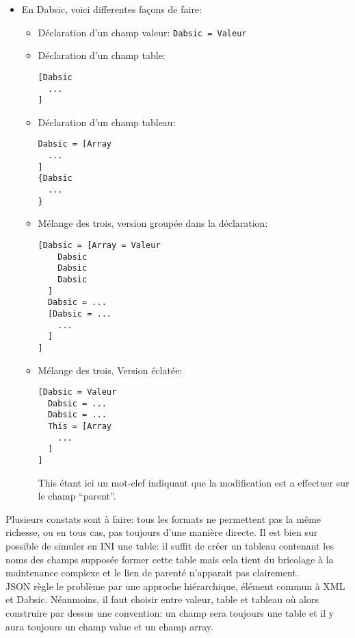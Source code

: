 \documentclass[a5paper, 12pt]{book}
\begin{document}
\begin{itemize}
  \item En Dabsic, voici differentes façons de faire:
    \begin{itemize}
      \item Déclaration d'un champ valeur:
        \verb!Dabsic = Valeur!
      \item Déclaration d'un champ table:
      \begin{verbatim}
[Dabsic
  ...
]
        \end{verbatim}
      \item Déclaration d'un champ tableau:
        \begin{verbatim}
Dabsic = [Array
  ...
]
{Dabsic
  ...
}
        \end{verbatim}
      \item Mélange des trois, version groupée dans la déclaration:
        \begin{verbatim}
[Dabsic = [Array = Valeur
    Dabsic
    Dabsic
    Dabsic
  ]
  Dabsic = ...
  [Dabsic = ...
    ...
  ]
]
\end{verbatim}

	\newpage
      \item Mélange des trois, Version éclatée:
        \begin{verbatim}
[Dabsic = Valeur
  Dabsic = ...
  Dabsic = ...
  This = [Array
    ...
  ]
]
\end{verbatim}
		\vspace{\baselineskip}
        This étant ici un mot-clef indiquant que la modification est a
        effectuer sur le champ ``parent''.
    \end{itemize}
\end{itemize}
\vspace{\baselineskip}

Plusieurs constats sont à faire: tous les formats ne permettent pas
la même richesse, ou en tous cas, pas toujours d'une manière directe.
Il est bien sur possible de simuler en INI une table: il suffit de créer
un tableau contenant les noms des champs supposée former cette table
mais cela tient du bricolage à la maintenance complexe et le lien
de parenté n'apparait pas clairement.\\

JSON règle le problème par une approche hiérarchique, élément commun
à XML et Dabsic. Néanmoins, il faut choisir entre valeur, table et
tableau où alors construire par dessus une convention: un champ sera
toujours une table et il y aura toujours un champ value et un champ
array.\\
\end{document}
